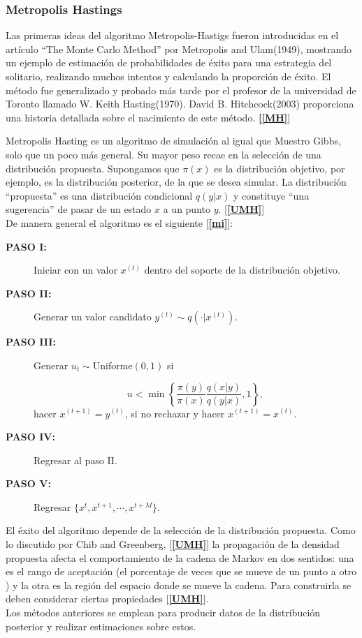 \subsubsection{Metropolis Hastings}
\noindent Las primeras ideas del algoritmo Metropolis-Hastigs fueron introducidas en el art\'iculo
``The Monte Carlo Method'' por Metropolis and Ulam(1949), mostrando un ejemplo de estimaci\'on de probabilidades de \'exito para una estrategia del solitario, realizando muchos intentos y   calculando la proporci\'on de \'exito. El m\'etodo fue generalizado y probado m\'as tarde por el profesor de la universidad de Toronto  llamado W. Keith Hasting(1970). David B. Hitchcock(2003) proporciona una historia detallada sobre el nacimiento de este m\'etodo. {\bf [\ref{MH}}]

\noindent Metropolis Hasting es un algoritmo de simulaci\'on al igual que Muestro Gibbs, solo que un poco m\'as general. Su mayor peso recae en la selecci\'on de una distribuci\'on propuesta.
\noindent Supongamos que $\pi(x)$ es la distribuci\'on objetivo, por ejemplo, es la distribuci\'on posterior, de la que se desea simular. La distribuci\'on ``propuesta'' es una distribuci\'on condicional $q(y|x)$ y constituye ``una sugerencia'' de pasar de un estado $x$ a  un punto $y$. [{\bf \ref{UMH}}]\\
\noindent De manera general el algoritmo es el siguiente [{\bf \ref{mi}}]: 

\begin{description}
\item[{\bf  PASO I:}] Iniciar con un valor $x^{(t)}$  dentro del soporte de la distribuci\'on objetivo.

\item[{\bf PASO II:}] Generar un valor candidato $y^{(t)}\sim q(\cdot|x^{(t)})$.

\item [{\bf PASO III:}] Generar $u_t \sim $Uniforme$(0,1)$ si 

$$u < \min \left\{\frac{\pi(y)}{\pi(x)}\frac{q(x|y)}{q(y|x)},1\right\},$$  
hacer $x^{(t+1)}=y^{(t)}$, si no rechazar y hacer $x^{(t+1)}=x^{(t)}$.
\item  [{\bf PASO IV:}]Regresar al paso II.
\item [{\bf PASO V:}] Regresar $\{x^{t},x^{t+1},\cdots, x^{t+M}\}$.
\end{description}
\noindent El \'exito del algoritmo depende de la selecci\'on de la distribuci\'on propuesta. Como lo discutido por Chib and Greenberg, [{\bf \ref{UMH}}] la propagaci\'on de la densidad propuesta afecta el comportamiento de la cadena de Markov en dos sentidos:
una es el rango de aceptaci\'on (el porcentaje de veces que se mueve de un punto a otro ) y la otra es la regi\'on del espacio donde se mueve la cadena. Para construirla se deben considerar ciertas propiedades [{\bf \ref{UMH}}].\\[0.1cm]
\noindent Los m\'etodos anteriores  se emplean para producir datos de la distribuci\'on posterior y realizar estimaciones sobre estos.


